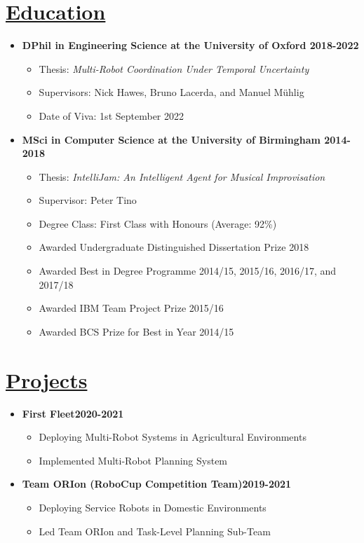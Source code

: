 \documentclass[11pt]{article}
\begin{document}
\section*{\uline{Education}}
\begin {itemize}
\item \textbf{DPhil in Engineering Science at the University of Oxford \hfill 2018-2022} 
\begin{itemize}
    \item Thesis: \emph{Multi-Robot Coordination Under Temporal Uncertainty}
    \item Supervisors: Nick Hawes, Bruno Lacerda, and Manuel M{\"u}hlig
    \item Date of Viva: 1st September 2022
\end{itemize}
			
\item \textbf{MSci in Computer Science at the University of Birmingham \hfill 2014-2018}
\begin{itemize}
\item Thesis: \emph{IntelliJam: An Intelligent Agent for Musical Improvisation}
\item Supervisor: Peter Tino
\item Degree Class: First Class with Honours (Average: 92\%)
\item Awarded Undergraduate Distinguished Dissertation Prize 2018
\item Awarded Best in Degree Programme 2014/15, 2015/16, 2016/17, and 2017/18
\item Awarded IBM Team Project Prize 2015/16
\item Awarded BCS Prize for Best in Year 2014/15
\end{itemize}
\end{itemize}

\section*{\underline{Projects}}
\begin{itemize}
\item \textbf{First Fleet\hfill 2020-2021}
\begin{itemize}
\item Deploying Multi-Robot Systems in Agricultural Environments
\item Implemented Multi-Robot Planning System
\end{itemize}
\item \textbf{Team ORIon (RoboCup Competition Team)\hfill 2019-2021}
\begin{itemize}
\item Deploying Service Robots in Domestic Environments
\item Led Team ORIon and Task-Level Planning Sub-Team
\end{itemize}
\end{itemize}
\end{document}
